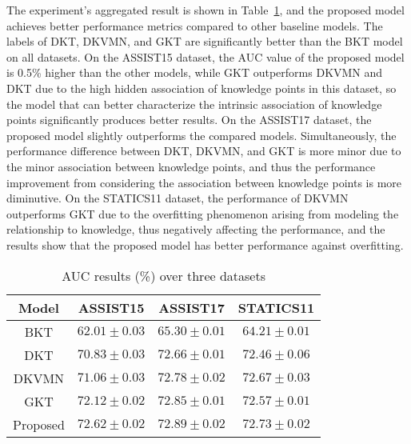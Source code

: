 The experiment's aggregated result is shown in Table~\ref{tbl:ch3-tb2}, and the proposed model achieves better performance metrics compared to other baseline models. The labels of DKT, DKVMN, and GKT are significantly better than the BKT model on all datasets. On the ASSIST15 dataset, the AUC value of the proposed model is 0.5\% higher than the other models, while GKT outperforms DKVMN and DKT due to the high hidden association of knowledge points in this dataset, so the model that can better characterize the intrinsic association of knowledge points significantly produces better results. On the ASSIST17 dataset, the proposed model slightly outperforms the compared models. Simultaneously, the performance difference between DKT, DKVMN, and GKT is more minor due to the minor association between knowledge points, and thus the performance improvement from considering the association between knowledge points is more diminutive. On the STATICS11 dataset, the performance of DKVMN outperforms GKT due to the overfitting phenomenon arising from modeling the relationship to knowledge, thus negatively affecting the performance, and the results show that the proposed model has better performance against overfitting.

\begin{table}[htbp!]
	\centering
	\caption{AUC results (\%) over three datasets}\label{tbl:ch3-tb2}
	\begin{tabular}{cccc}
		\toprule
		Model    & ASSIST15                    & ASSIST17                   & STATICS11                  \\
		\midrule
		BKT      & \(62.01\pm 0.03 \)          & \(65.30\pm 0.01\)          & \(64.21\pm 0.01\)          \\
		DKT      & \(70.83\pm 0.03 \)          & \(72.66\pm 0.01\)          & \(72.46\pm 0.06\)          \\
		DKVMN    & \(71.06\pm 0.03 \)          & \(72.78\pm 0.02\)          & \(72.67\pm 0.03\)          \\
		GKT      & \(72.12\pm 0.02 \)          & \(72.85\pm 0.01\)          & \(72.57\pm 0.01\)          \\
		\midrule
		Proposed & \(\mathbf{72.62\pm 0.02} \) & \(\mathbf{72.89\pm 0.02}\) & \(\mathbf{72.73\pm 0.02}\) \\
		\bottomrule
	\end{tabular}
\end{table}
